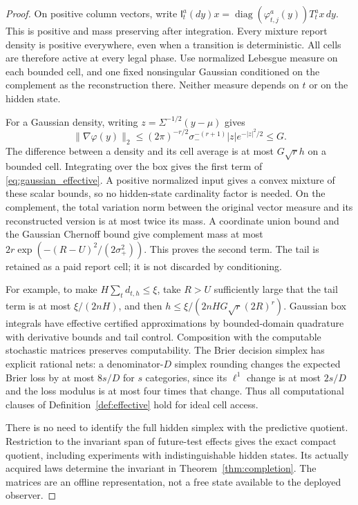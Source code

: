 \begin{proof}
On positive column vectors, write
$\mathsf I_t^a(dy)x=\operatorname{diag}(\varphi_{t,j}^a(y))T_t^a x\,dy$.
This is positive and mass preserving after integration. Every mixture report density is positive everywhere, even when a transition is deterministic. All cells are therefore active at every legal phase. Use normalized Lebesgue measure on each bounded cell, and one fixed nonsingular Gaussian conditioned on the complement as the reconstruction there. Neither measure depends on $t$ or on the hidden state.

For a Gaussian density, writing $z=\Sigma^{-1/2}(y-\mu)$ gives
\[
 \|\nabla\varphi(y)\|_2
 \le (2\pi)^{-r/2}\sigma_-^{-(r+1)}|z|e^{-|z|^2/2}
 \le G.
\]
The difference between a density and its cell average is at most $G\sqrt r h$ on a bounded cell. Integrating over the box gives the first term of \eqref{eq:gaussian_effective}. A positive normalized input gives a convex mixture of these scalar bounds, so no hidden-state cardinality factor is needed. On the complement, the total variation norm between the original vector measure and its reconstructed version is at most twice its mass. A coordinate union bound and the Gaussian Chernoff bound give complement mass at most $2r\exp(-(R-U)^2/(2\sigma_+^2))$. This proves the second term. The tail is retained as a paid report cell; it is not discarded by conditioning.

For example, to make $H\sum_t d_{t,h}\le\xi$, take $R>U$ sufficiently large that the tail term is at most $\xi/(2nH)$, and then $h\le\xi/(2nHG\sqrt r(2R)^r)$. Gaussian box integrals have effective certified approximations by bounded-domain quadrature with derivative bounds and tail control. Composition with the computable stochastic matrices preserves computability. The Brier decision simplex has explicit rational nets: a denominator-$D$ simplex rounding changes the expected Brier loss by at most $8s/D$ for $s$ categories, since its $\ell^1$ change is at most $2s/D$ and the loss modulus is at most four times that change. Thus all computational clauses of Definition~\ref{def:effective} hold for ideal cell access.

There is no need to identify the full hidden simplex with the predictive quotient. Restriction to the invariant span of future-test effects gives the exact compact quotient, including experiments with indistinguishable hidden states. Its actually acquired laws determine the invariant in Theorem~\ref{thm:completion}. The matrices are an offline representation, not a free state available to the deployed observer.
\end{proof}
